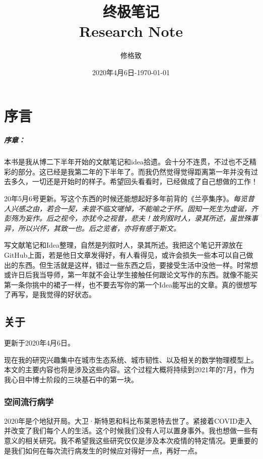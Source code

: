 \documentclass[letterpaper,twocolumn]{book}
\title{终极笔记 \\ Research Note}
\author{修格致}
\date{2020年4月6日-\today}
\begin{document}
\frontmatter

\maketitle

\tableofcontents

\mainmatter

\chapter{序言}

\paragraph{序章：} 本书是我从博二下半年开始的文献笔记和idea拾遗。会十分不连贯，不过也不乏精彩的部分。这已经是我第二年的下半年了。而我仍然觉得觉得距离第一年并没有过去多久，一切还是开始时的样子。希望回头看看时，已经做成了自己想做的工作！

20年5月6号更新。写这个东西的时候还能想起好多年前背的《兰亭集序》。\textit{每览昔人兴感之由，若合一契，未尝不临文嗟悼，不能喻之于怀。固知一死生为虚诞，齐彭殇为妄作。后之视今，亦犹今之视昔，悲夫！故列叙时人，录其所述，虽世殊事异，所以兴怀，其致一也。后之览者，亦将有感于斯文。}

写文献笔记和Idea整理，自然是列叙时人，录其所述。我把这个笔记开源放在GitHub上面，若是他日文章发得好，有人看得见，或许会损失一些本可以自己做出的东西。但生活就是这样，错过一些东西之后，要接受生活中没他一样。时常想或许日后我当导师，第一年就不会让学生接触任何跟论文写作的东西。就像不能买第一条你挑中的裙子一样，也不要去写你的第一个Idea能写出的文章。真的很想写了再写，是我觉得的好状态。


\section{关于}
\textcolor[rgb]{0,0,1}{更新于2020年4月6日。}

现在我的研究兴趣集中在城市生态系统、城市韧性、以及相关的数学物理模型上。本文的主要内容也将是涉及这些内容。这个过程大概将持续到2021年的7月，作为我心目中博士阶段的三块基石中的第一块。

\subsection{空间流行病学}
2020年是个地狱开局。大卫·斯特恩和科比布莱恩特去世了。紧接着COVID走入并改变了我们每个人的生活。这个时候我们没有人可以置身事外。我也想做一些有意义的相关研究。我不希望我这些研究仅仅是涉及本次疫情的特定情况。更重要的是我们如何在每次流行病发生的时候应对得好一点，再好一点。
\end{document}
